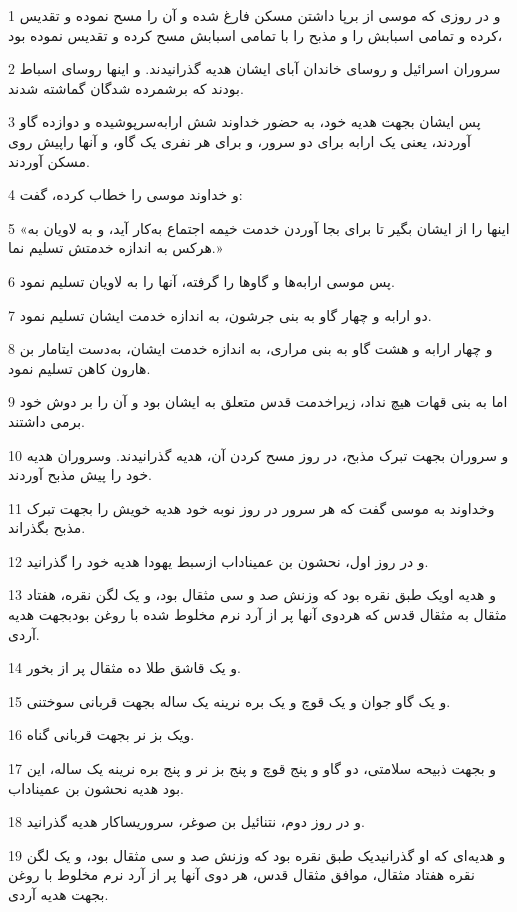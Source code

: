 \par 1 و در روزی که موسی از برپا داشتن مسکن فارغ شده و آن را مسح نموده و تقدیس کرده و تمامی اسبابش را و مذبح را با تمامی اسبابش مسح کرده و تقدیس نموده بود،
\par 2 سروران اسرائیل و روسای خاندان آبای ایشان هدیه گذرانیدند. و اینها روسای اسباط بودند که برشمرده شدگان گماشته شدند.
\par 3 پس ایشان بجهت هدیه خود، به حضور خداوند شش ارابه‌سرپوشیده و دوازده گاو آوردند، یعنی یک ارابه برای دو سرور، و برای هر نفری یک گاو، و آنها راپیش روی مسکن آوردند.
\par 4 و خداوند موسی را خطاب کرده، گفت:
\par 5 «اینها را از ایشان بگیر تا برای بجا آوردن خدمت خیمه اجتماع به‌کار آید، و به لاویان به هرکس به اندازه خدمتش تسلیم نما.»
\par 6 پس موسی ارابه‌ها و گاوها را گرفته، آنها را به لاویان تسلیم نمود.
\par 7 دو ارابه و چهار گاو به بنی جرشون، به اندازه خدمت ایشان تسلیم نمود.
\par 8 و چهار ارابه و هشت گاو به بنی مراری، به اندازه خدمت ایشان، به‌دست ایتامار بن هارون کاهن تسلیم نمود.
\par 9 اما به بنی قهات هیچ نداد، زیراخدمت قدس متعلق به ایشان بود و آن را بر دوش خود برمی داشتند.
\par 10 و سروران بجهت تبرک مذبح، در روز مسح کردن آن، هدیه گذرانیدند. وسروران هدیه خود را پیش مذبح آوردند.
\par 11 وخداوند به موسی گفت که هر سرور در روز نوبه خود هدیه خویش را بجهت تبرک مذبح بگذراند.
\par 12 و در روز اول، نحشون بن عمیناداب ازسبط یهودا هدیه خود را گذرانید.
\par 13 و هدیه اویک طبق نقره بود که وزنش صد و سی مثقال بود، و یک لگن نقره، هفتاد مثقال به مثقال قدس که هردوی آنها پر از آرد نرم مخلوط شده با روغن بودبجهت هدیه آردی.
\par 14 و یک قاشق طلا ده مثقال پر از بخور.
\par 15 و یک گاو جوان و یک قوچ و یک بره نرینه یک ساله بجهت قربانی سوختنی.
\par 16 ویک بز نر بجهت قربانی گناه.
\par 17 و بجهت ذبیحه سلامتی، دو گاو و پنج قوچ و پنج بز نر و پنج بره نرینه یک ساله، این بود هدیه نحشون بن عمیناداب.
\par 18 و در روز دوم، نتنائیل بن صوغر، سروریساکار هدیه گذرانید.
\par 19 و هدیه‌ای که او گذرانیدیک طبق نقره بود که وزنش صد و سی مثقال بود، و یک لگن نقره هفتاد مثقال، موافق مثقال قدس، هر دوی آنها پر از آرد نرم مخلوط با روغن بجهت هدیه آردی.
